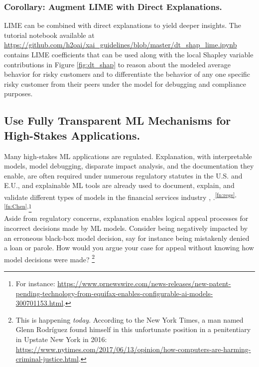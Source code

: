 \documentclass[sigconf]{acmart}
\begin{document}
\subsubsection{Corollary: Augment LIME with Direct Explanations.} LIME can be combined with direct explanations to yield deeper insights.  The tutorial notebook available at \url{https://github.com/h2oai/xai_guidelines/blob/master/dt_shap_lime.ipynb} contains LIME coefficients that can be used along with the local Shapley variable contributions in Figure \ref{fig:dt_shap} to reason about the modeled average behavior for risky customers and to differentiate the behavior of any one specific risky customer from their peers under the model for debugging and compliance purposes.

\subsection{Use Fully Transparent ML Mechanisms for High-Stakes Applications.} \label{sec:white_box}

Many high-stakes ML applications are regulated. Explanation, with interpretable models, model debugging, disparate impact analysis, and the documentation they enable, are often required under numerous regulatory statutes in the U.S. and E.U., and explainable ML tools are already used to document, explain, and validate different types of models in the financial services industry \cite{lime-sup}, \cite{wf_xnn}.\textsuperscript{\ref{fn:regs}, \ref{fn:Chen},}\footnote{\scriptsize{For instance: \url{https://www.prnewswire.com/news-releases/new-patent-pending-technology-from-equifax-enables-configurable-ai-models-300701153.html}.}}\\

\vspace{-8pt}
\noindent Aside from regulatory concerns, explanation enables logical appeal processes for incorrect decisions made by ML models. Consider being negatively impacted by an erroneous black-box model decision, say for instance being mistakenly denied a loan or parole. How would you argue your case for appeal without knowing how model decisions were made? \footnote{This is happening \textit{today}. According to the New York Times, a man named Glenn Rodr\'iguez found himself in this unfortunate position in a penitentiary in Upstate New York in 2016: \url{https://www.nytimes.com/2017/06/13/opinion/how-computers-are-harming-criminal-justice.html}.}
\end{document}
